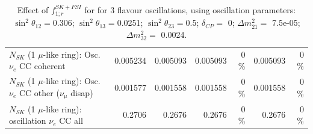 \begin{table}
\begin{tabular}{| l | r | r | r  r | r  r |}
                          $N_{SK}$ (1 $\mu$-like ring): Osc. $\nu_e$ CC coherent &        0.005234 &        0.005093 &        0.005093 &        0 \%  &        0.005093 &        0 \%  \\ 
           $N_{SK}$ (1 $\mu$-like ring): Osc. $\nu_e$ CC other ($\nu_\mu$ disap) &        0.001577 &        0.001558 &        0.001558 &        0 \%  &        0.001558 &        0 \%  \\ 
                        $N_{SK}$ (1 $\mu$-like ring): oscillation $\nu_e$ CC all &          0.2706 &          0.2676 &          0.2676 &        0 \%  &          0.2676 &        0 \%  \\ 
\hline
\hline
\end{tabular}
\caption{ Effect of $f_{1; r}^{SK+FSI}$ for for 3 flavour oscillations, using oscillation parameters:  $\sin^2\theta_{12} = $0.306; $\sin^2\theta_{13} = $0.0251; $\sin^2\theta_{23} = $0.5; $\delta_{CP} = $        0; $\Delta m^2_{21} = $    7.5e-05; $\Delta m^2_{32} = $    0.0024. }
\label{tab:num_skdetfsi_001_1RmuT_3f_osc_t13:0.0251_spectralreco_spectraltrue}
\end{table}
\clearpage
